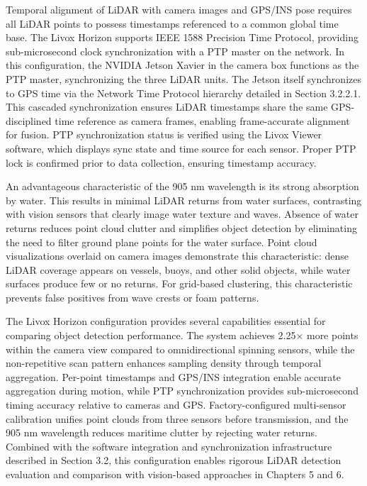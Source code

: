 \documentclass{erauthesis}
\begin{document}
Temporal alignment of \ac{LiDAR} with camera images and \ac{GPS}/\ac{INS} pose requires all \ac{LiDAR} points to possess timestamps referenced to a common global time base.
The Livox Horizon supports IEEE 1588 Precision Time Protocol, providing sub-microsecond clock synchronization with a PTP master on the network.
In this configuration, the NVIDIA Jetson Xavier in the camera box functions as the PTP master, synchronizing the three \ac{LiDAR} units.
The Jetson itself synchronizes to \ac{GPS} time via the Network Time Protocol hierarchy detailed in Section 3.2.2.1.
This cascaded synchronization ensures \ac{LiDAR} timestamps share the same \ac{GPS}-disciplined time reference as camera frames, enabling frame-accurate alignment for fusion.
PTP synchronization status is verified using the Livox Viewer software, which displays sync state and time source for each sensor.
Proper PTP lock is confirmed prior to data collection, ensuring timestamp accuracy.

An advantageous characteristic of the 905 nm wavelength is its strong absorption by water.
This results in minimal \ac{LiDAR} returns from water surfaces, contrasting with vision sensors that clearly image water texture and waves.
Absence of water returns reduces point cloud clutter and simplifies object detection by eliminating the need to filter ground plane points for the water surface.
Point cloud visualizations overlaid on camera images demonstrate this characteristic: dense \ac{LiDAR} coverage appears on vessels, buoys, and other solid objects, while water surfaces produce few or no returns.
For grid-based clustering, this characteristic prevents false positives from wave crests or foam patterns.

The Livox Horizon configuration provides several capabilities essential for comparing object detection performance.
The system achieves 2.25× more points within the camera view compared to omnidirectional spinning sensors, while the non-repetitive scan pattern enhances sampling density through temporal aggregation.
Per-point timestamps and \ac{GPS}/\ac{INS} integration enable accurate aggregation during motion, while PTP synchronization provides sub-microsecond timing accuracy relative to cameras and \ac{GPS}.
Factory-configured multi-sensor calibration unifies point clouds from three sensors before transmission, and the 905 nm wavelength reduces maritime clutter by rejecting water returns.
Combined with the software integration and synchronization infrastructure described in Section 3.2, this configuration enables rigorous \ac{LiDAR} detection evaluation and comparison with vision-based approaches in Chapters 5 and 6.
\end{document}
